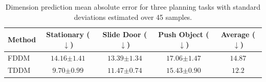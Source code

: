 \begin{table}[t]
     \centering
   \caption{Dimension prediction mean absolute error for three planning tasks with standard deviations estimated over 45 samples.}
   \begin{tabular}{@{}lcccc@{}}
     \toprule
     Method & Stationary ($\downarrow$) & Slide Door ($\downarrow$) & Push Object ($\downarrow$) & Average ($\downarrow$)   \\ \midrule
     FDDM & $14.16 {\scriptstyle \pm 1.41}$ & $13.39 {\scriptstyle \pm 1.34}$ & $17.06 {\scriptstyle \pm 1.47}$ & $14.87$ \\
     TDDM & $\mathbf{9.70 {\scriptstyle \pm 0.99}}$ & $\mathbf{11.47 {\scriptstyle \pm 0.74}}$ & $\mathbf{15.43 {\scriptstyle \pm 0.90}}$ & $\mathbf{12.2}$ \\ \bottomrule
   \end{tabular}
   \label{tab:video_results}
\end{table}
